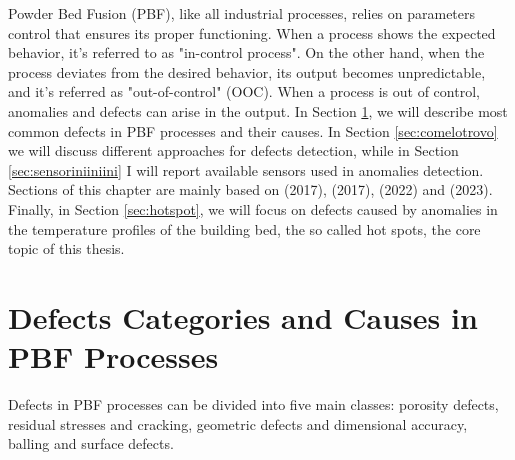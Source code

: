 Powder Bed Fusion (PBF), like all industrial processes, relies on parameters control that ensures its proper functioning. When a process shows the expected behavior, it's referred to as "in-control process". On the other hand, when the process deviates from the desired behavior, its output becomes unpredictable, and it's referred as "out-of-control" (OOC). When a process is out of control, anomalies and defects can arise in the output. In Section \ref{sec:defects}, we will describe most common defects in PBF processes and their causes. In Section \ref{sec:comelotrovo} we will discuss different approaches for defects detection, while in Section \ref{sec:sensoriniiniini} I will report available sensors used in anomalies detection.  Sections of this chapter are mainly based on \citeauthor{grasso_-process_2017} (2017), \citeauthor{grasso_process_2017} (2017), \citeauthor{mostafaei_defects_2022} (2022) and \citeauthor{wu_additively_2023} (2023). Finally, in Section \ref{sec:hotspot}, we will focus on defects caused by anomalies in the temperature profiles of the building bed, the so called hot spots, the core topic of this thesis.

\section{Defects Categories and Causes in PBF Processes}
\label{sec:defects}
Defects in PBF processes can be divided into five main classes: porosity defects, residual stresses and cracking, geometric defects and dimensional accuracy, balling and surface defects.
